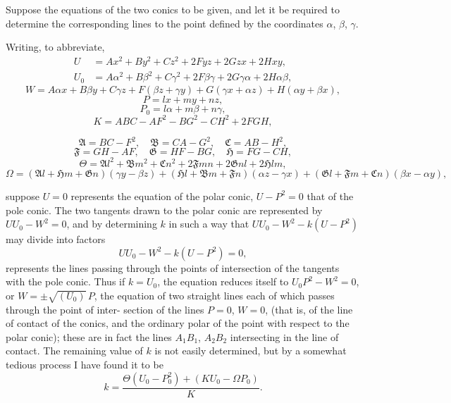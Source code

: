 \documentclass[11pt]{article}
\begin{document}
\medskip

Suppose the equations of the two conics to be given, and let it be required to
determine the corresponding lines to the point defined by the coordinates $\alpha$, $\beta$, $\gamma$.

\smallskip
Writing, to abbreviate,
\[
\begin{aligned}
U  &= Ax^{2} + By^{2} + Cz^{2} + 2Fyz + 2Gzx + 2Hxy,\\
U_{0} &= A\alpha^{2} + B\beta^{2} + C\gamma^{2} + 2F\beta\gamma + 2G\gamma\alpha + 2H\alpha\beta,
\end{aligned}
\]
\[
W = A\alpha x + B\beta y + C\gamma z + F(\beta z + \gamma y) + G(\gamma x + \alpha z) + H(\alpha y + \beta x),
\]
\[
P = lx + my + nz,
\]
\[
P_{0} = l\alpha + m\beta + n\gamma,
\]
\[
K = ABC - AF^{2} - BG^{2} - CH^{2} + 2FGH,
\]

\[
\mathfrak{A} = BC - F^{2},\quad \mathfrak{B} = CA - G^{2},\quad \mathfrak{C} = AB - H^{2},
\]
\[
\mathfrak{F} = GH - AF,\quad \mathfrak{G} = HF - BG,\quad \mathfrak{H} = FG - CH,
\]
\[
\Theta = \mathfrak{A}l^{2} + \mathfrak{B}m^{2} + \mathfrak{C}n^{2} + 2\mathfrak{F}mn + 2\mathfrak{G}nl + 2\mathfrak{H}lm,
\]
\[
\Omega = (\mathfrak{A}l + \mathfrak{H}m + \mathfrak{G}n)(\gamma y - \beta z)
+ (\mathfrak{H}l + \mathfrak{B}m + \mathfrak{F}n)(\alpha z - \gamma x)
+ (\mathfrak{G}l + \mathfrak{F}m + \mathfrak{C}n)(\beta x - \alpha y),
\]

suppose $U = 0$ represents the equation of the polar conic, $U - P^{2} = 0$ that of the pole
conic. The two tangents drawn to the polar conic are represented by $UU_{0} - W^{2} = 0$, and
by determining $k$ in such a way that $UU_{0} - W^{2} - k(U - P^{2})$ may divide into factors
\[
UU_{0} - W^{2} - k(U - P^{2}) = 0,
\]
represents the lines passing through the points of intersection of the tangents with the pole
conic. Thus if $k = U_{0}$, the equation reduces itself to $U_{0}P^{2} - W^{2} = 0$, or $W = \pm\sqrt{(U_{0})}\,P$,
the equation of two straight lines each of which passes through the point of inter-\linebreak
section of the lines $P = 0$, $W = 0$, (that is, of the line of contact of the conics, and the
ordinary polar of the point with respect to the polar conic); these are in fact the
lines $A_{1}B_{1}$, $A_{2}B_{2}$ intersecting in the line of contact. The remaining value of $k$ is not
easily determined, but by a somewhat tedious process I have found it to be
\[
k = \frac{\Theta(U_{0} - P_{0}^{2}) + (KU_{0} - \Omega P_{0})}{K}.
\]
\end{document}
